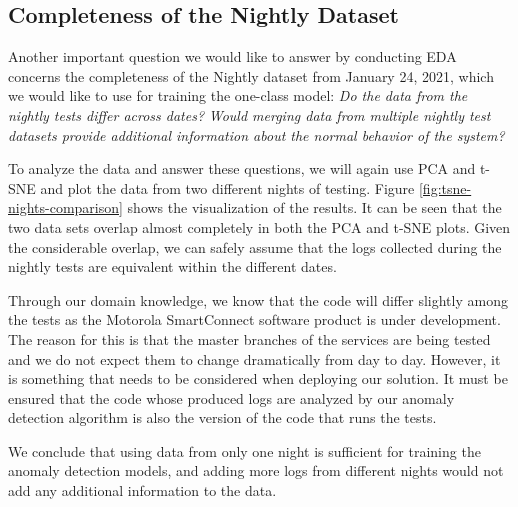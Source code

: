 \subsection{Completeness of the Nightly Dataset}
\label{assumption-completeness}

Another important question we would like to answer by conducting EDA concerns the completeness of the Nightly dataset from January 24, 2021, which we would like to use for training the one-class model: \textit{Do the data from the nightly tests differ across dates?} \textit{Would merging data from multiple nightly test datasets provide additional information about the normal behavior of the system?}

To analyze the data and answer these questions, we will again use PCA and t-SNE and plot the data from two different nights of testing. Figure \ref{fig:tsne-nights-comparison} shows the visualization of the results. It can be seen that the two data sets overlap almost completely in both the PCA and t-SNE plots. Given the considerable overlap, we can safely assume that the logs collected during the nightly tests are equivalent within the different dates.

Through our domain knowledge, we know that the code will differ slightly among the tests as the Motorola SmartConnect software product is under development. The reason for this is that the master branches of the services are being tested and we do not expect them to change dramatically from day to day. 
However, it is something that needs to be considered when deploying our solution. It must be ensured that the code whose produced logs are analyzed by our anomaly detection algorithm is also the version of the code that runs the tests.

We conclude that using data from only one night is sufficient for training the anomaly detection models, and adding more logs from different nights would not add any additional information to the data. 

